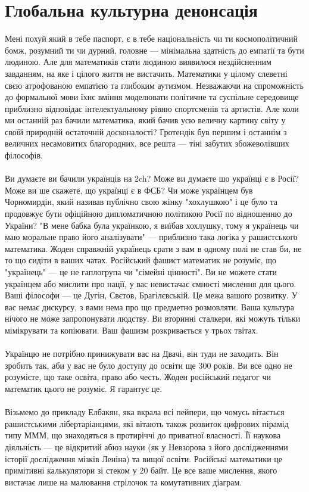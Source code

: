 \section{Глобальна культурна денонсація}

Мені похуй який в тебе паспорт, є в тебе національність чи ти космополітичний бомж, розумний ти чи дурний, головне — мінімальна здатність до емпатії та бути людиною. Але для математиків стати людиною виявилося нездійсненним завданням, на яке і цілого життя не вистачить. Математики у цілому слеветні свєю атрофованою емпатією та глибоким аутизмом. Незважаючи на спроможність до формальної мови їхнє вміння моделювати політичне та суспільне середовище приблизно відповідає інтелектуальному рівню спортсменів та артистів. Але коли ми останній раз бачили математика, який бачив усю величну картину світу у своїй природній остаточній досконалості? Гротендік був першим і останнім з величних несамовитих благородних, все решта — тіні забутих збожеволівших філософів.
\\
\\
Ви думаєте ви бачили українців на 2ch? Може ви думаєте шо українці є в Росії? Може ви ше скажете, що українці є в ФСБ? Чи може українцем був Чорномирдін, який називав публічно свою жінку "хохлушкою" і це було та продовжує бути офіційною дипломатичною політикою Росії по відношенню до України? "В мене бабка була українкою, я виїбав хохлушку, тому я українець чи маю моральне право його аналізувати" — приблизно така логіка у рашистського математика. Жоден справжній українець срати з вам в одному полі не став би, не то що сидіти в ваших чатах. Російський фашист математик не розуміє, що "українець" — це не гаплогрупа чи "сімейні цінності". Ви не можете стати українцем або мислити про нації, у вас невистачає ємності мислення для цього. Ваші філософи — це Дугін, Свєтов, Брагілєвській. Це межа вашого розвитку. У вас немає дискурсу, з вами нема про що предметно розмовляти. Ваша культура нічого не може запропонувати людству. Ви вторинні сталкери, які можуть тільки мімікрувати та копіювати. Ваш фашизм розкривається у трьох твітах.
\\
\\
Українцю не потрібно принижувати вас на Двачі, він туди не заходить. Він зробить так, аби у вас не було доступу до освіти ще 300 років. Ви все одно не розумієте, що таке освіта, право або честь. Жоден російський педагог чи математик цього не розуміє. Я гарантує це.
\\
\\
Візьмемо до прикладу Елбакян, яка вкрала всі пейпери, що чомусь вітається рашистськими лібертаріанцями, які вітають також розвиток цифрових пірамід типу МММ, що знаходяться в протиріччі до приватної власності. Її наукова діяльність — це відкритий абюз науки (як у Невзорова з його дослідженнями історії дослідження мізків Леніна) та вищої освіти. Російські математики це примітивні калькулятори зі стеком у 20 байт. Це все ваше мислення, якого вистачає лише на малювання стрілочок та комутативних діаграм.
